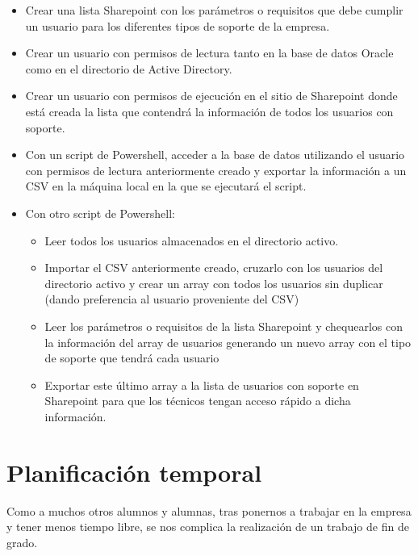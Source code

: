 \documentclass[a4paper, 12pt]{book}
\begin{document}
\begin{itemize}
\item Crear una lista Sharepoint con los parámetros o requisitos que debe cumplir un usuario para los diferentes tipos de soporte de la empresa.

\item Crear un usuario con permisos de lectura tanto en la base de datos Oracle como en el directorio de Active Directory.

\item Crear un usuario con permisos de ejecución en el sitio de Sharepoint donde está creada la lista que contendrá la información de todos los usuarios con soporte.

\item Con un script de Powershell, acceder a la base de datos utilizando el usuario con permisos de lectura anteriormente creado y exportar la información a un CSV en la máquina local en la que se ejecutará el script.

\item Con otro script de Powershell:

	\begin{itemize}
		\item Leer todos los usuarios almacenados en el directorio activo.
		
		\item Importar el CSV anteriormente creado, cruzarlo con los usuarios del directorio activo y crear un array con todos los usuarios sin duplicar (dando preferencia al usuario proveniente del CSV)
		
		\item Leer los parámetros o requisitos de la lista Sharepoint y chequearlos con la información del array de usuarios generando un nuevo array con el tipo de soporte que tendrá cada usuario
		
		\item Exportar este último array a la lista de usuarios con soporte en Sharepoint para que los técnicos tengan acceso rápido a dicha información.
	\end{itemize}
\end{itemize}

\section{Planificación temporal}
\label{sec:planificacion-temporal}

Como a muchos otros alumnos y alumnas, tras ponernos a trabajar en la empresa y tener menos tiempo libre, se nos complica la realización de un trabajo de fin de grado.
\\
\end{document}
